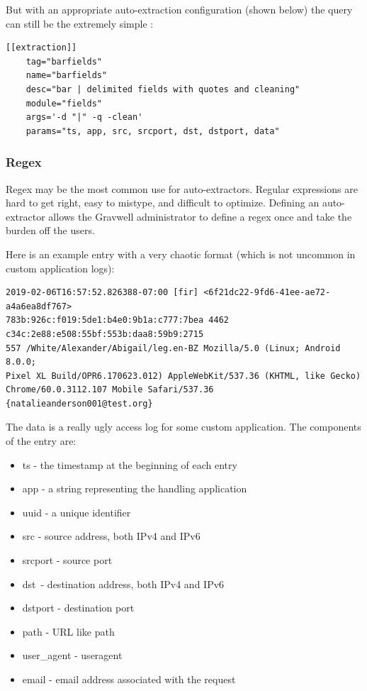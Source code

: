 But with an appropriate auto-extraction configuration (shown below) the
query can still be the extremely simple :

\begin{Verbatim}[breaklines=true]
[[extraction]]
    tag="barfields"
    name="barfields"
    desc="bar | delimited fields with quotes and cleaning"
    module="fields"
    args='-d "|" -q -clean'
    params="ts, app, src, srcport, dst, dstport, data"
\end{Verbatim}

\subsubsection{Regex}

Regex may be the most common use for auto-extractors. Regular
expressions are hard to get right, easy to mistype, and difficult to
optimize. Defining an auto-extractor allows the Gravwell administrator
to define a regex once and take the burden off the users.

Here is an example entry with a very chaotic format (which is not
uncommon in custom application logs):

\begin{Verbatim}[breaklines=true]
2019-02-06T16:57:52.826388-07:00 [fir] <6f21dc22-9fd6-41ee-ae72-a4a6ea8df767> 
783b:926c:f019:5de1:b4e0:9b1a:c777:7bea 4462 c34c:2e88:e508:55bf:553b:daa8:59b9:2715 
557 /White/Alexander/Abigail/leg.en-BZ Mozilla/5.0 (Linux; Android 8.0.0; 
Pixel XL Build/OPR6.170623.012) AppleWebKit/537.36 (KHTML, like Gecko) 
Chrome/60.0.3112.107 Mobile Safari/537.36 {natalieanderson001@test.org}
\end{Verbatim}

The data is a really ugly access log for some custom application. The
components of the entry are:

\begin{itemize}
\tightlist
\item
  {ts - the timestamp at the beginning of each entry}
\item
  {app - a string representing the handling application}
\item
  {uuid - a unique identifier}
\item
  {src - source address, both IPv4 and IPv6}
\item
  {srcport - source port}
\item
  {dst}{~- destination address, both IPv4 and IPv6}
\item
  {dstport - destination port}
\item
  {path - URL like path}
\item
  {user\_agent - useragent}
\item
  {email - email address associated with the request}
\end{itemize}

